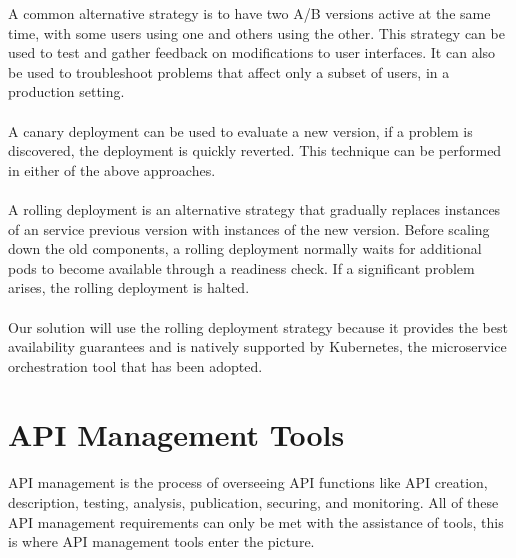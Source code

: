 A common alternative strategy is to have two A/B versions active at the same time, with some users using one and others using the other.
This strategy can be used to test and gather feedback on modifications to user interfaces.
It can also be used to troubleshoot problems that affect only a subset of users, in a production setting.

\paragraph{}

A canary deployment can be used to evaluate a new version, if a problem is discovered, the deployment is quickly reverted.
This technique can be performed in either of the above approaches.

\paragraph{}

A rolling deployment is an alternative strategy that gradually replaces instances of an service previous version with instances of the new version.
Before scaling down the old components, a rolling deployment normally waits for additional pods to become available through a readiness check.
If a significant problem arises, the rolling deployment is halted.

\paragraph{}

Our solution will use the rolling deployment strategy because it provides the best availability guarantees
and is natively supported by Kubernetes, the microservice orchestration tool that has been adopted.

\section{API Management Tools} %
\label{sec:api_management_tools}

API management is the process of overseeing API functions like API creation, description, testing, analysis, publication, securing, and monitoring.
All of these API management requirements can only be met with the assistance of tools, this is where API management tools enter the picture.

\paragraph{}

